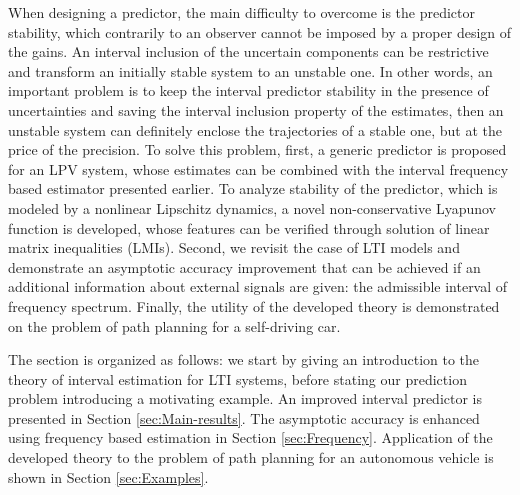When designing a predictor, the main difficulty to overcome is the predictor stability, which contrarily to an observer cannot be imposed by a proper design of the gains. An interval inclusion of the uncertain components can be restrictive and transform an initially stable system to an unstable one. In other words, an important problem is to keep the interval predictor stability in the presence of uncertainties and saving the interval inclusion property of the estimates, then an unstable system can definitely enclose the trajectories of a stable one, but at the price of the precision. To solve this problem, first, a generic predictor is proposed for an LPV system, whose estimates can be combined with the interval frequency based estimator presented earlier. To analyze stability of the predictor, which is modeled by a nonlinear Lipschitz dynamics, a novel non-conservative Lyapunov function is developed, whose features can be verified through solution of linear matrix inequalities (LMIs). Second, we revisit the case of LTI models and demonstrate an asymptotic accuracy improvement that can be achieved if an additional information about external signals are given: the admissible interval of frequency spectrum. Finally, the utility of the developed theory is demonstrated on the problem of path planning for a self-driving car.

The section is organized as follows: we start by giving an introduction to the theory of interval estimation for LTI systems, before stating our prediction problem  introducing a motivating example. An improved interval predictor is presented in Section \ref{sec:Main-results}. The asymptotic accuracy is enhanced using frequency based estimation in Section \ref{sec:Frequency}. Application of the developed theory to the problem of path planning for an autonomous vehicle is shown in Section \ref{sec:Examples}.


